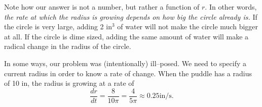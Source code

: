 {\begin{enumerate}
Note how our answer is not a number, but rather a function of $r$. In other words, \textit{the rate at which the radius is growing depends on how big the circle already is.} If the circle is very large, adding 2 in$^3$ of water will not make the circle much bigger at all. If the circle is dime sized, adding the same amount of water will make a radical change in the radius of the circle.

In some ways, our problem was (intentionally) ill--posed. We need to specify a current radius in order to know a rate of change. When the puddle has a radius of 10 in, the radius is growing at a rate of $$
\frac{dr}{dt} = \frac{8}{10\pi} = \frac{4}{5\pi} \approx 0.25 \text{in/s}.$$
 
\end{enumerate}
\baselineskip
}\\

